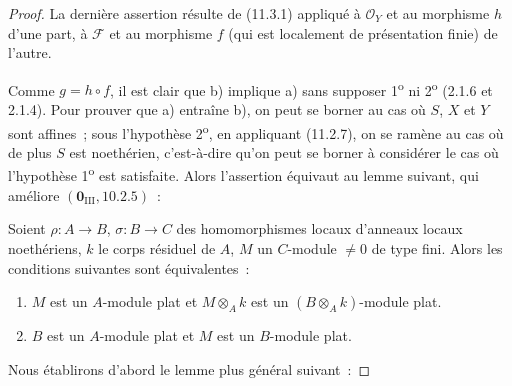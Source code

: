 \begin{proof}
La dernière assertion résulte de (11.3.1) appliqué à $\mathcal O_Y$ et au
morphisme $h$ d'une part, à $\mathcal F$ et au morphisme $f$ (qui est
localement de présentation finie) de l'autre.

Comme $g=h\circ f$, il est clair que b) implique a) sans supposer
1\textsuperscript{o} ni 2\textsuperscript{o} (2.1.6 et 2.1.4). Pour prouver que
a) entraîne b), on peut se borner au cas où $S$, $X$ et $Y$ sont affines~;
sous l'hypothèse 2\textsuperscript{o}, en appliquant (11.2.7), on se ramène au
cas où de plus $S$ est noethérien, c'est-à-dire qu'on peut se borner à
considérer le cas où l'hypothèse 1\textsuperscript{o} est satisfaite. Alors
l'assertion équivaut au lemme suivant, qui améliore
$(\mathbf 0_{\mathrm{III}},10.2.5)$~:

\begin{lemma}[11.3.10.1]
\label{IV.11.3.10.1-fr}
Soient $\rho:A\to B$, $\sigma:B\to C$ des homomorphismes locaux d'anneaux
locaux noethériens, $k$ le corps résiduel de $A$, $M$ un $C$-module
$\neq0$ de type fini. Alors les conditions suivantes sont équivalentes~:
\begin{enumerate}[label=\emph{\alph*)}]
\item $M$ est un $A$-module plat et $M\otimes_Ak$ est un
$(B\otimes_Ak)$-module plat.
\item $B$ est un $A$-module plat et $M$ est un $B$-module plat.
\end{enumerate}
\end{lemma}

Nous établirons d'abord le lemme plus général suivant~:


\end{proof}
